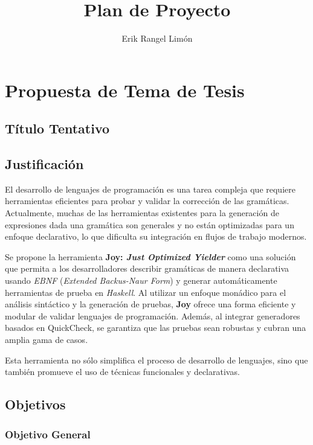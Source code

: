 \documentclass[12pt]{article}
\title{Plan de Proyecto}
\author{Erik Rangel Limón}
\date{}
\begin{document}

\maketitle

\section*{Propuesta de Tema de Tesis}

\subsection*{Título Tentativo}


\subsection*{Justificación}

El desarrollo de lenguajes de programación es una tarea compleja que requiere herramientas eficientes para probar y validar la corrección de las gramáticas. Actualmente, muchas de las herramientas existentes para la generación de expresiones dada una gramática son generales y no están optimizadas para un enfoque declarativo, lo que dificulta su integración en flujos de trabajo modernos.

Se propone la herramienta \textbf{Joy: \textit{Just Optimized Yielder}} como una solución que permita a los desarrolladores describir gramáticas de manera declarativa usando \textit{EBNF} (\textit{Extended Backus-Naur Form}) y generar automáticamente herramientas de prueba en \textit{Haskell}. Al utilizar un enfoque monádico para el análisis sintáctico y la generación de pruebas, \textbf{Joy} ofrece una forma eficiente y modular de validar lenguajes de programación. Además, al integrar generadores basados en QuickCheck, se garantiza que las pruebas sean robustas y cubran una amplia gama de casos.

Esta herramienta no sólo simplifica el proceso de desarrollo de lenguajes, sino que también promueve el uso de técnicas funcionales y declarativas.

\subsection*{Objetivos}

\subsubsection*{Objetivo General}
\end{document}
